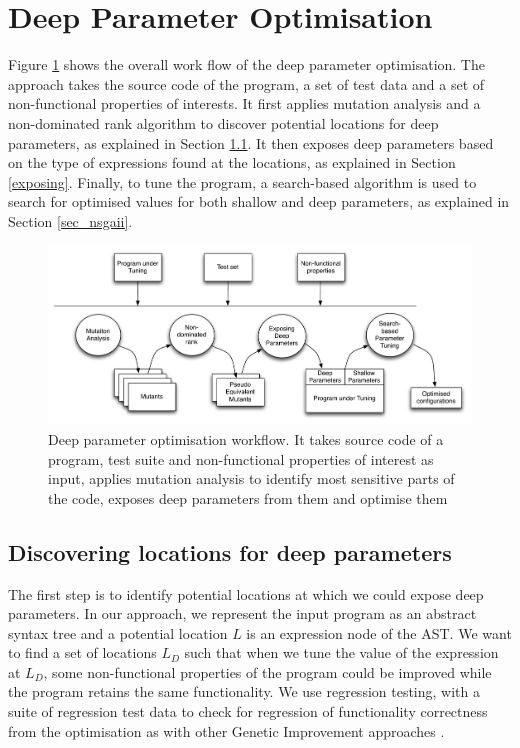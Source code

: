 \section{Deep Parameter Optimisation}
\label{sec_deep_parameter_optimisation}

Figure \ref{system} shows the overall work flow of the deep parameter optimisation. The approach takes the source code of the program, a set of test data and a set of non-functional properties of interests. 
It first applies mutation analysis and a non-dominated rank algorithm to discover potential locations for deep parameters, as explained in Section \ref{discovering}. It then exposes deep parameters based on the type of expressions found at the locations, as explained in Section \ref{exposing}. Finally, to tune the program, a search-based algorithm is used to search for optimised values for both shallow and deep parameters, as explained in Section \ref{sec_nsgaii}.

\begin{figure}[htbp]
\centering
\includegraphics[width=6.2in]{pics/new_system}
\caption{Deep parameter optimisation workflow. It takes source code of a program, test suite and non-functional properties of interest as input, applies mutation analysis to identify most sensitive parts of the code, exposes deep parameters from them and optimise them}\label{system}
\end{figure}

\subsection{Discovering locations for deep parameters}
\label{discovering}
The first step is to identify potential locations at which we could expose deep parameters. 
In our approach, we represent the input program as an abstract syntax tree and a potential location $L$ is an expression node of the AST. 
We want to find a set of locations $L_D$ such that when we tune the value of the expression at $L_D$, some non-functional properties of the program could be improved while the program retains the same functionality. 
We use regression testing, with a suite of regression test data to check for regression of functionality correctness from the optimisation as with other Genetic Improvement approaches \cite{justyna2013, Langdon:2014:IMI:2576768.2598244}.

